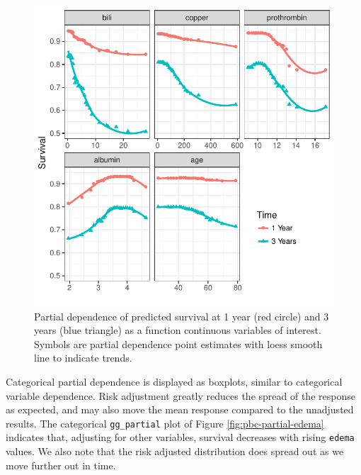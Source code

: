 \documentclass[article, nojss]{jss}
\begin{document}
\begin{Schunk}
\begin{figure}[!htb]

{\centering \includegraphics{rfs-pbc-partial-panel-1}

}

\caption[Partial dependence of predicted survival at 1 year (red circle) and 3 years (blue triangle) as a function continuous variables of interest]{Partial dependence of predicted survival at 1 year (red circle) and 3 years (blue triangle) as a function continuous variables of interest. Symbols are partial dependence point estimates with loess smooth line to indicate trends.}\label{fig:pbc-partial-panel}
\end{figure}
\end{Schunk}

Categorical partial dependence is displayed as boxplots, similar to
categorical variable dependence. Risk adjustment greatly reduces the
spread of the response as expected, and may also move the mean response
compared to the unadjusted results. The categorical \texttt{gg\_partial}
plot of Figure \ref{fig:pbc-partial-edema} indicates that, adjusting for
other variables, survival decreases with rising \texttt{edema} values.
We also note that the risk adjusted distribution does spread out as we
move further out in time.
\end{document}
